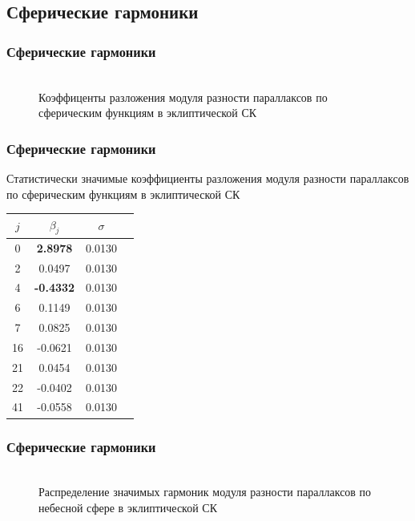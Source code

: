 \documentclass[12pt,aspectratio=43]{beamer}
\begin{document}
\begin{frame}
\begin{figure}[H]
\end{figure}
\end{frame}


\subsection{Сферические гармоники}\label{sistem}  
\begin{frame}[<alignment>]
\frametitle{Сферические гармоники}

\begin{figure}[h!]
\center{\texttt{[image: sf\_j\_p]}}\\{Коэффиценты разложения модуля разности параллаксов по сферическим функциям в эклиптической СК}
\label{img:sf_j}
\end{figure}
\end{frame}	

\begin{frame}[<alignment>]
\frametitle{Сферические гармоники}
Статистически значимые коэффициенты разложения модуля разности параллаксов по сферическим функциям в эклиптической СК
\begin{table}[h]
\centering
\begin{tabular}{|c|c|c|c|}
\hline 	
$j$ &$\beta_{j}$ & $\sigma$\\
\hline
\hline
0 &	\textbf{2.8978} &0.0130\\
2 &	0.0497&0.0130\\
4 &	\textbf{-0.4332}&0.0130\\
6	&0.1149&0.0130\\
7	&0.0825&0.0130\\
16	&-0.0621&0.0130\\
21	&0.0454&0.0130\\
22	&-0.0402&0.0130\\
41	&-0.0558&0.0130\\
\hline 	
\end{tabular}
\end{table}
\end{frame}	

\begin{frame}
\frametitle{Сферические гармоники}
\begin{figure}[h!]
\\{Распределение значимых гармоник модуля разности параллаксов по небесной сфере в эклиптической СК}
\end{figure}
\end{frame}	
\end{document}
